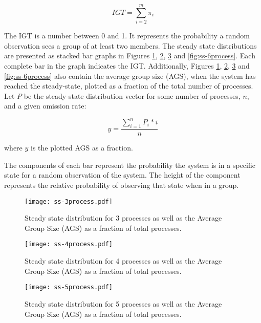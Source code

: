 \begin{equation} IGT = \sum_{i=2}^{m} \pi_i \end{equation}

The IGT is a number between 0 and 1.
It represents the probability a random observation sees a group of at least two members.
The steady state distributions are presented as stacked bar graphs in Figures \ref{fig:ss-3process}, \ref{fig:ss-4process}, \ref{fig:ss-5process} and \ref{fig:ss-6process}.
Each complete bar in the graph indicates the IGT.
Additionally, Figures \ref{fig:ss-3process}, \ref{fig:ss-4process}, \ref{fig:ss-5process} and \ref{fig:ss-6process} also contain the average group size (AGS), when the system has reached the steady-state, plotted as a fraction of the total number of processes.
Let $P$ be the steady-state distribution vector for some number of processes, $n$, and a given omission rate:

\begin{equation} y = \frac{\sum_{i=1}^{n} P_{i}*i}{n} \label{eq:ss-means} \end{equation}

where $y$ is the plotted AGS as a fraction.

The components of each bar represent the probability the system is in a specific state for a random observation of the system.
The height of the component represents the relative probability of observing that state when in a group.

\begin{figure}
    \centering
    \texttt{[image: ss-3process.pdf]}
    \caption{Steady state distribution for 3 processes as well as the Average Group Size (AGS) as a fraction of total processes.}
    \label{fig:ss-3process}
\end{figure}

\begin{figure}
    \centering
    \texttt{[image: ss-4process.pdf]}
    \caption{Steady state distribution for 4 processes as well as the Average Group Size (AGS) as a fraction of total processes.}
    \label{fig:ss-4process}
\end{figure}

\begin{figure}
    \centering
    \texttt{[image: ss-5process.pdf]}
    \caption{Steady state distribution for 5 processes as well as the Average Group Size (AGS) as a fraction of total processes.}
    \label{fig:ss-5process}
\end{figure}


